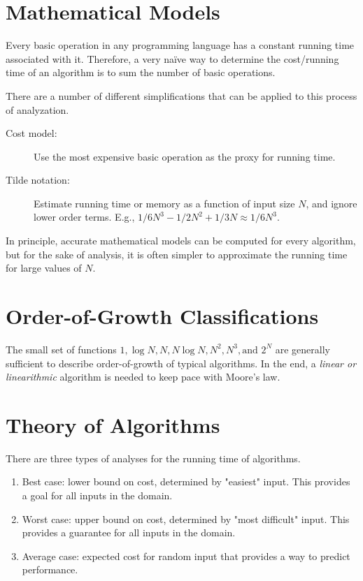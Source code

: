 \documentclass[11pt]{article}
\begin{document}
\section{Mathematical Models}
	Every basic operation in any programming language has a constant running time associated with it. Therefore, a very na\"{i}ve way to determine the cost/running time of an algorithm is to sum the number of basic operations.
	
	There are a number of different simplifications that can be applied to this process of analyzation.
	\begin{description}
		\item[Cost model:] Use the most expensive basic operation as the proxy for running time.
		\item[Tilde notation:] Estimate running time or memory as a function of input size $N$, and ignore lower order terms. E.g., $1/6 N^3 - 1/2 N^2 + 1/3 N \approx 1/6 N^3$.
	\end{description}
	
	In principle, accurate mathematical models can be computed for every algorithm, but for the sake of analysis, it is often simpler to approximate the running time for large values of $N$.
	
\section{Order-of-Growth Classifications}
	The small set of functions $1, \log N, N, N\log N, N^2, N^3, \text{and } 2^N$ are generally sufficient to describe order-of-growth of typical algorithms. In the end, a \textit{linear or linearithmic} algorithm is needed to keep pace with Moore's law.
	
\section{Theory of Algorithms}
	There are three types of analyses for the running time of algorithms.
	\begin{enumerate}
		\item {} Best case: lower bound on cost, determined by "easiest" input. This provides a goal for all inputs in the domain.
		\item Worst case: upper bound on cost, determined by "most difficult" input. This provides a guarantee for all inputs in the domain.
		\item Average case: expected cost for random input that provides a way to predict performance.
	\end{enumerate}
	
\end{document}
